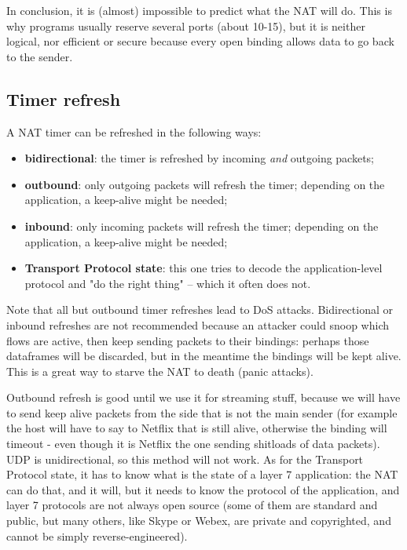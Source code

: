 In conclusion, it is (almost) impossible to predict what the NAT will do. This is why programs usually reserve several ports (about 10-15), but it is neither logical, nor efficient or secure because every open binding allows data to go back to the sender.


\subsection{Timer refresh}
A NAT timer can be refreshed in the following ways:

\begin{itemize}
    \item \textbf{bidirectional}: the timer is refreshed by incoming \textit{and} outgoing packets;
    \item \textbf{outbound}: only outgoing packets will refresh the timer; depending on the application, a
keep-alive might be needed;
    \item \textbf{inbound}: only incoming packets will refresh the timer; depending on the application, a
keep-alive might be needed;
    \item \textbf{Transport Protocol state}: this one tries to decode the application-level protocol and "do the right thing" – which it often does not.
\end{itemize}

Note that all but outbound timer refreshes lead to DoS attacks. Bidirectional or inbound refreshes are not recommended because an attacker could snoop which flows are active, then keep sending packets to their bindings: perhaps those dataframes will be discarded, but in the meantime the bindings will be kept alive. This is a great way to starve the NAT to death (panic attacks).

Outbound refresh is good until we use it for streaming stuff, because we will have to send keep alive packets from the side that is not the main sender (for example the host will have to say to Netflix that is still alive, otherwise the binding will timeout - even though it is Netflix the one sending shitloads of data packets). UDP is unidirectional, so this method will not work. As for the Transport Protocol state, it has to know what is the state of a layer 7 application: the NAT can do that, and it will,  but it needs to know the protocol of the application, and layer 7 protocols are not always open source (some of them are standard and public, but many others, like Skype or Webex, are private and copyrighted, and cannot be simply reverse-engineered).

